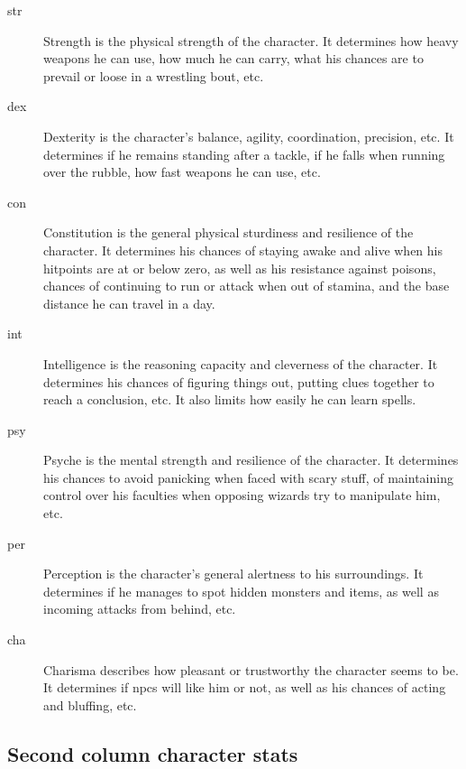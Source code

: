 \begin{description}

\item[str] Strength is the physical strength of the character. It determines how heavy weapons he can use, how much he can carry, what his chances are to prevail or loose in a wrestling bout, etc.

\item[dex] Dexterity is the character's balance, agility, coordination, precision, etc. It determines if he remains standing after a tackle, if he falls when running over the rubble, how fast weapons he can use, etc.

\item[con] Constitution is the general physical sturdiness and resilience of the character. It determines his chances of staying awake and alive when his hitpoints are at or below zero, as well as his resistance against poisons, chances of continuing to run or attack when out of stamina, and the base distance he can travel in a day.

\item[int] Intelligence is the reasoning capacity and cleverness of the character. It determines his chances of figuring things out, putting clues together to reach a conclusion, etc. It also limits how easily he can learn spells.

\item[psy] Psyche is the mental strength and resilience of the character. It determines his chances to avoid panicking when faced with scary stuff, of maintaining control over his faculties when opposing wizards try to manipulate him, etc.

\item[per] Perception is the character's general alertness to his surroundings. It determines if he manages to spot hidden monsters and items, as well as incoming attacks from behind, etc.

\item[cha] Charisma describes how pleasant or trustworthy the character seems to be. It determines if npcs will like him or not, as well as his chances of acting and bluffing, etc.

\end{description}


\subsection*{Second column character stats}

